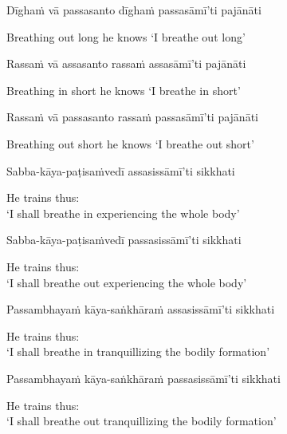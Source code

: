 Dīghaṁ vā passasanto dīghaṁ passasāmī'ti pajānāti

\begin{english}
  Breathing out long he knows `I breathe out long'
\end{english}

Rassaṁ vā assasanto rassaṁ assasāmī'ti pajānāti

\begin{english}
  Breathing in short he knows `I breathe in short'
\end{english}

Rassaṁ vā passasanto rassaṁ passasāmī'ti pajānāti

\begin{english}
  Breathing out short he knows `I breathe out short'
\end{english}

Sabba-kāya-paṭisaṁvedī assasissāmī'ti sikkhati

\begin{english}
  He trains thus:\\
  `I shall breathe in experiencing the whole body'
\end{english}

Sabba-kāya-paṭisaṁvedī passasissāmī'ti sikkhati

\begin{english}
  He trains thus:\\
  `I shall breathe out experiencing the whole body'
\end{english}

Passambhayaṁ kāya-saṅkhāraṁ assasissāmī'ti sikkhati

\begin{english}
  He trains thus:\\
  `I shall breathe in tranquillizing the bodily formation'\makeatletter\hyperlink{endnote68-appendix}\makeatother
\end{english}

Passambhayaṁ kāya-saṅkhāraṁ passasissāmī'ti sikkhati

\begin{english}
  He trains thus:\\
  `I shall breathe out tranquillizing the bodily formation'
\end{english}

